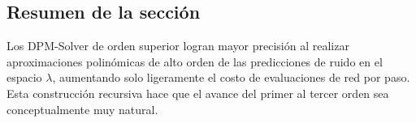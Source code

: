 \subsection{Resumen de la sección}

Los DPM-Solver de orden superior logran mayor precisión al realizar aproximaciones polinómicas de alto orden de las predicciones de ruido en el espacio $\lambda$, aumentando solo ligeramente el costo de evaluaciones de red por paso. Esta construcción recursiva hace que el avance del primer al tercer orden sea conceptualmente muy natural.
